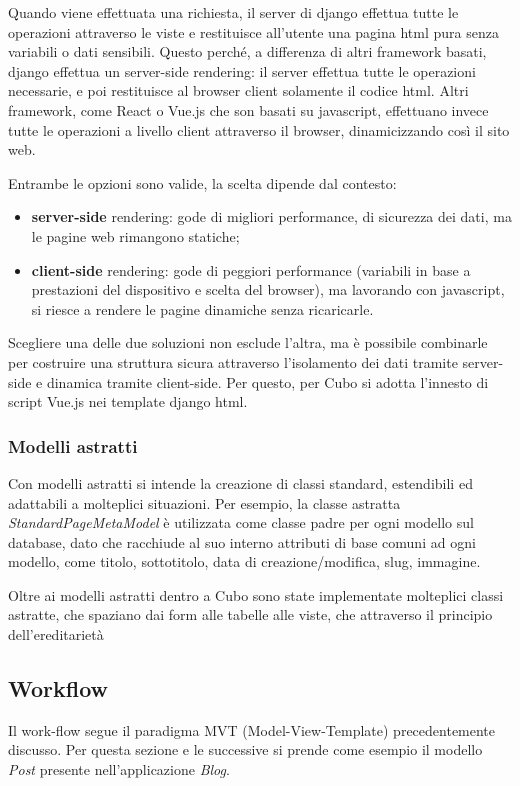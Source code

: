 \documentclass[12pt,a4paper]{article}
\begin{document}
Quando viene effettuata una richiesta, il server di django effettua tutte le operazioni attraverso le viste e restituisce all’utente una pagina html pura senza variabili o dati sensibili. Questo perché, a differenza di altri framework basati, django effettua un server-side rendering: il server effettua tutte le operazioni necessarie, e poi restituisce al browser client solamente il codice html.
Altri framework, come React o Vue.js che son basati su javascript, effettuano invece tutte le operazioni a livello client attraverso il browser, dinamicizzando così il sito web.


Entrambe le opzioni sono valide, la scelta dipende dal contesto:
\begin{itemize}
    \item \textbf{server-side} rendering: gode di migliori performance, di sicurezza dei dati, ma le pagine web rimangono statiche;
    \item \textbf{client-side} rendering: gode di peggiori performance (variabili in base a prestazioni del dispositivo e scelta del browser), ma lavorando con javascript, si riesce a rendere le pagine dinamiche senza ricaricarle.
\end{itemize}
Scegliere una delle due soluzioni non esclude l’altra, ma è possibile combinarle per costruire una struttura sicura attraverso l’isolamento dei dati tramite server-side e dinamica tramite client-side. Per questo, per Cubo si adotta l’innesto di script Vue.js nei template django html.

\subsubsection{Modelli astratti}
Con modelli astratti si intende la creazione di classi standard, estendibili ed adattabili a molteplici situazioni. Per esempio, la classe astratta \textit{StandardPageMetaModel} è utilizzata come classe padre per ogni modello sul database, dato che racchiude al suo interno attributi di base comuni ad ogni modello, come titolo, sottotitolo, data di creazione/modifica, slug, immagine.

Oltre ai modelli astratti dentro a Cubo sono state implementate molteplici classi astratte, che spaziano dai form alle tabelle alle viste, che attraverso il principio dell'ereditarietà

\subsection{Workflow}
Il work-flow segue il paradigma MVT (Model-View-Template) precedentemente discusso.
Per questa sezione e le successive si prende come esempio il modello \textit{Post} presente nell’applicazione \textit{Blog}.
\end{document}
